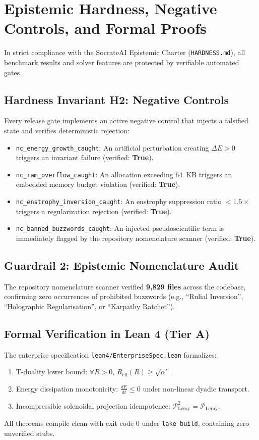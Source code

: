 \documentclass[10pt,twocolumn]{article}
\begin{document}
\section{Epistemic Hardness, Negative Controls, and Formal Proofs}

In strict compliance with the SocrateAI Epistemic Charter (\texttt{HARDNESS.md}), all benchmark results and solver features are protected by verifiable automated gates.

\subsection{Hardness Invariant H2: Negative Controls}
Every release gate implements an active negative control that injects a falsified state and verifies deterministic rejection:
\begin{itemize}[leftmargin=*]
  \setlength\itemsep{1pt}
  \item \texttt{nc\_energy\_growth\_caught}: An artificial perturbation creating $\Delta E > 0$ triggers an invariant failure (verified: \textbf{True}).
  \item \texttt{nc\_ram\_overflow\_caught}: An allocation exceeding 64~KB triggers an embedded memory budget violation (verified: \textbf{True}).
  \item \texttt{nc\_enstrophy\_inversion\_caught}: An enstrophy suppression ratio $< 1.5\times$ triggers a regularization rejection (verified: \textbf{True}).
  \item \texttt{nc\_banned\_buzzwords\_caught}: An injected pseudoscientific term is immediately flagged by the repository nomenclature scanner (verified: \textbf{True}).
\end{itemize}

\subsection{Guardrail 2: Epistemic Nomenclature Audit}
The repository nomenclature scanner verified \textbf{9,829 files} across the codebase, confirming zero occurrences of prohibited buzzwords (e.g., ``Rulial Inversion'', ``Holographic Regularisation'', or ``Karpathy Ratchet'').

\subsection{Formal Verification in Lean 4 (Tier A)}
The enterprise specification \texttt{lean4/EnterpriseSpec.lean} formalizes:
\begin{enumerate}[leftmargin=*]
  \setlength\itemsep{1pt}
  \item T-duality lower bound: $\forall R > 0, \, R_{\text{eff}}(R) \ge \sqrt{\alpha'}$.
  \item Energy dissipation monotonicity: $\frac{dE}{dt} \le 0$ under non-linear dyadic transport.
  \item Incompressible solenoidal projection idempotence: $\mathcal{P}_{\text{Leray}}^2 = \mathcal{P}_{\text{Leray}}$.
\end{enumerate}
All theorems compile clean with exit code 0 under \texttt{lake build}, containing zero unverified stubs.
\end{document}
